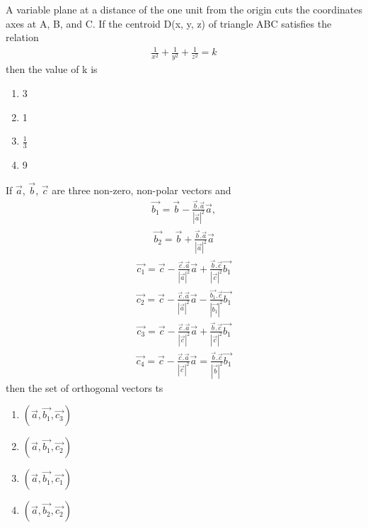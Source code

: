 \item A variable plane at a distance of the one unit from the origin cuts the coordinates axes at A, B, and C. If the centroid D(x, y, z) of triangle ABC satisfies the relation
\begin{align*}
\frac{1}{x^{2}} + \frac{1}{y^{2}} + \frac{1}{z^{2}} = k
\end{align*}
then the value of k is
\begin{enumerate}
\item 3
\item 1
\item $\frac{1}{3}$
\item 9
\end{enumerate}

\item If $\overrightarrow{a}$, $\overrightarrow{b}$, $\overrightarrow{c}$ are three non-zero, non-polar vectors and 
\begin{align*}
\overrightarrow{b_1} = \overrightarrow{b} - \frac{\overrightarrow{b}.\overrightarrow{a}}{|\overrightarrow{a}|^{2}}\overrightarrow{a},
\end{align*}
\begin{align*}
\overrightarrow{b_2} = \overrightarrow{b} + \frac{\overrightarrow{b}.\overrightarrow{a}}{|\overrightarrow{a}|^{2}}\overrightarrow{a} 
\end{align*}
\begin{align*}
\overrightarrow{c_1} = \overrightarrow{c} - \frac{\overrightarrow{c}.\overrightarrow{a}}{|\overrightarrow{a}|^{2}}\overrightarrow{a} + \frac{\overrightarrow{b}.\overrightarrow{c}}{|\overrightarrow{c}|^{2}}\overrightarrow{b_1}
\end{align*}
\begin{align*}
\overrightarrow{c_2} = \overrightarrow{c} - \frac{\overrightarrow{c}.\overrightarrow{a}}{|\overrightarrow{a}|^{2}}\overrightarrow{a} - \frac{\overrightarrow{b_1}.\overrightarrow{c}}{|\overrightarrow{b_1}|^{2}}\overrightarrow{b_1}
\end{align*}
\begin{align*}
\overrightarrow{c_3} = \overrightarrow{c} - \frac{\overrightarrow{c}.\overrightarrow{a}}{|\overrightarrow{c}|^{2}}\overrightarrow{a} + \frac{\overrightarrow{b}.\overrightarrow{c}}{|\overrightarrow{c}|^{2}}\overrightarrow{b_1}
\end{align*}
\begin{align*}
\overrightarrow{c_4} = \overrightarrow{c} - \frac{\overrightarrow{c}.\overrightarrow{a}}{|\overrightarrow{c}|^{2}}\overrightarrow{a} = \frac{\overrightarrow{b}.\overrightarrow{c}}{|\overrightarrow{b}|^{2}}\overrightarrow{b_1}
\end{align*}
then the set of orthogonal vectors ts
\begin{enumerate}
\item $(\overrightarrow{a}, \overrightarrow{b_1}, \overrightarrow{c_3})$
\item $(\overrightarrow{a}, \overrightarrow{b_1}, \overrightarrow{c_2})$
\item $(\overrightarrow{a}, \overrightarrow{b_1}, \overrightarrow{c_1})$
\item $(\overrightarrow{a}, \overrightarrow{b_2}, \overrightarrow{c_2})$
\end{enumerate}

